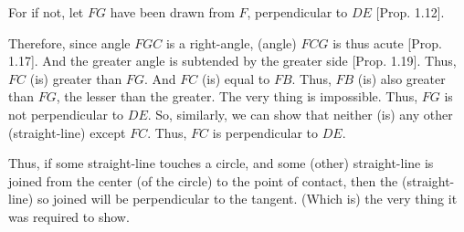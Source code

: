 \begin{Parallel}{}{}
{For if not, let $FG$ have been drawn from $F$, perpendicular to $DE$ [Prop. 1.12].

Therefore, since angle $FGC$ is a right-angle, (angle) $FCG$ is thus acute [Prop. 1.17]. And the greater angle is subtended by the greater side [Prop. 1.19]. Thus, $FC$ (is) greater than $FG$. And $FC$ (is) equal to
$FB$. Thus, $FB$ (is)  also greater than $FG$, the lesser than the greater.
The very thing is impossible. Thus, $FG$ is not perpendicular to
$DE$. So, similarly, we can show that neither (is) any other
(straight-line) except $FC$. Thus, $FC$ is perpendicular  to $DE$.

Thus, if some straight-line  touches a circle, and some (other) straight-line is
joined from the center (of the circle) to the point of contact, then the (straight-line)
so joined will be perpendicular to the tangent. (Which is)
the very thing it was required to show.}
\end{Parallel}

